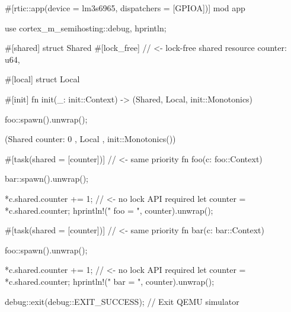 #[rtic::app(device = lm3s6965, dispatchers = [GPIOA])]
mod app {
    use cortex_m_semihosting::{debug, hprintln};

    #[shared]
    struct Shared {
        #[lock_free] // <- lock-free shared resource
        counter: u64,
    }

    #[local]
    struct Local {}

    #[init]
    fn init(_: init::Context) -> (Shared, Local, init::Monotonics) {
        foo::spawn().unwrap();

        (Shared { counter: 0 }, Local {}, init::Monotonics())
    }

    #[task(shared = [counter])] // <- same priority
    fn foo(c: foo::Context) {
        bar::spawn().unwrap();

        *c.shared.counter += 1; // <- no lock API required
        let counter = *c.shared.counter;
        hprintln!("  foo = {}", counter).unwrap();
    }

    #[task(shared = [counter])] // <- same priority
    fn bar(c: bar::Context) {
        foo::spawn().unwrap();

        *c.shared.counter += 1; // <- no lock API required
        let counter = *c.shared.counter;
        hprintln!("  bar = {}", counter).unwrap();

        debug::exit(debug::EXIT_SUCCESS); // Exit QEMU simulator
    }
}
